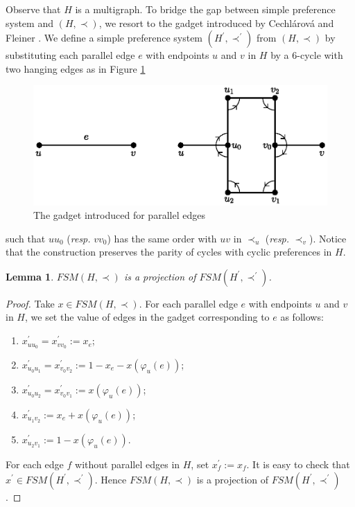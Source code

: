 \documentclass[11pt]{article}
\newtheorem{lemma}[theorem]{Lemma}
\numberwithin{theorem}{section}
\begin{document}
Observe that $H$ is a multigraph.
To bridge the gap between simple preference system and $(H,\prec)$,
we resort to the gadget introduced by Cechl\'{a}rov\'{a} and Fleiner \cite{CechFlei05}.
We define a simple preference system $(H^\prime,\prec^\prime)$ from $(H,\prec)$
by substituting each parallel edge $e$ with endpoints $u$ and $v$ in $H$ by a $6$-cycle with two hanging edges as in Figure \ref{gadget}
\begin{figure}
\centering
  \includegraphics[width=.65\linewidth]{KernelMengerian-gadget}
  \caption{The gadget introduced for parallel edges}
  \label{gadget}
\end{figure}
such that $u u_0$ (\textit{resp.} $v v_0$) has the same order with $u v$ in $\prec_u$ (\textit{resp.} $\prec_v$).
Notice that the construction preserves the parity of cycles with cyclic preferences in $H$.

\begin{lemma}
\label{lem:reduct1}
$FSM(H,\prec)$ is a projection of $FSM(H^\prime,\prec^\prime)$.
\end{lemma}
\begin{proof}
Take $x\in FSM(H,\prec)$.
For each parallel edge $e$ with endpoints $u$ and $v$ in $H$,
we set the value of edges in the gadget corresponding to $e$ as follows:
\begin{enumerate}[label={(\alph*)}, itemsep=0.2mm]
  \item $x^\prime_{u u_0}=x^\prime_{v v_0}:=x_{e}$;
  \item $x^\prime_{u_0 u_1}=x^\prime_{v_0 v_2}:=1-x_{e}-x(\varphi_u(e))$;
  \item $x^\prime_{u_0 u_2}=x^\prime_{v_0 v_1}:=x(\varphi_u (e))$;
  \item $x^\prime_{u_1 v_2}:=x_e +x(\varphi_u (e))$;
  \item $x^\prime_{u_2 v_1}:=1-x(\varphi_u (e))$.
\end{enumerate}
For each edge $f$ without parallel edges in $H$, set $x^\prime_f:=x_f$.
It is easy to check that $x^\prime\in FSM(H^\prime, \prec^\prime)$.
Hence $FSM(H,\prec)$ is a projection of $FSM(H^\prime,\prec^\prime)$.
\end{proof}
\end{document}

